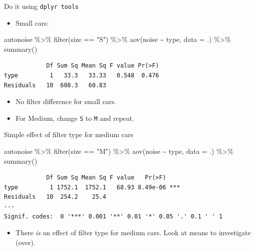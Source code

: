 \documentclass[
  ignorenonframetext,
]{beamer}
\newenvironment{Shaded}{\begin{snugshade}}{\end{snugshade}}
\newcommand{\AttributeTok}[1]{\textcolor[rgb]{0.40,0.45,0.13}{#1}}
\newcommand{\FunctionTok}[1]{\textcolor[rgb]{0.28,0.35,0.67}{#1}}
\newcommand{\NormalTok}[1]{\textcolor[rgb]{0.00,0.23,0.31}{#1}}
\newcommand{\SpecialCharTok}[1]{\textcolor[rgb]{0.37,0.37,0.37}{#1}}
\newcommand{\StringTok}[1]{\textcolor[rgb]{0.13,0.47,0.30}{#1}}
\providecommand{\tightlist}{%
  \setlength{\itemsep}{0pt}\setlength{\parskip}{0pt}}\usepackage{longtable,booktabs,array}
\begin{document}
\begin{frame}[fragile]{Do it using \texttt{dplyr\ tools}}
\protect\hypertarget{do-it-using-dplyr-tools}{}
\begin{itemize}
\tightlist
\item
  Small cars:
\end{itemize}

\begin{Shaded}
\begin{Highlighting}[]
\NormalTok{autonoise }\SpecialCharTok{\%\textgreater{}\%}
  \FunctionTok{filter}\NormalTok{(size }\SpecialCharTok{==} \StringTok{"S"}\NormalTok{) }\SpecialCharTok{\%\textgreater{}\%}
  \FunctionTok{aov}\NormalTok{(noise }\SpecialCharTok{\textasciitilde{}}\NormalTok{ type, }\AttributeTok{data =}\NormalTok{ .) }\SpecialCharTok{\%\textgreater{}\%}
  \FunctionTok{summary}\NormalTok{()}
\end{Highlighting}
\end{Shaded}

\begin{verbatim}
            Df Sum Sq Mean Sq F value Pr(>F)
type         1   33.3   33.33   0.548  0.476
Residuals   10  608.3   60.83               
\end{verbatim}

\begin{itemize}
\item
  No filter difference for small cars.
\item
  For Medium, change \texttt{S} to \texttt{M} and repeat.
\end{itemize}
\end{frame}

\begin{frame}[fragile]{Simple effect of filter type for medium cars}
\protect\hypertarget{simple-effect-of-filter-type-for-medium-cars}{}
\small

\begin{Shaded}
\begin{Highlighting}[]
\NormalTok{autonoise }\SpecialCharTok{\%\textgreater{}\%}
  \FunctionTok{filter}\NormalTok{(size }\SpecialCharTok{==} \StringTok{"M"}\NormalTok{) }\SpecialCharTok{\%\textgreater{}\%}
  \FunctionTok{aov}\NormalTok{(noise }\SpecialCharTok{\textasciitilde{}}\NormalTok{ type, }\AttributeTok{data =}\NormalTok{ .) }\SpecialCharTok{\%\textgreater{}\%}
  \FunctionTok{summary}\NormalTok{()}
\end{Highlighting}
\end{Shaded}

\begin{verbatim}
            Df Sum Sq Mean Sq F value   Pr(>F)    
type         1 1752.1  1752.1   68.93 8.49e-06 ***
Residuals   10  254.2    25.4                     
---
Signif. codes:  0 '***' 0.001 '**' 0.01 '*' 0.05 '.' 0.1 ' ' 1
\end{verbatim}

\normalsize

\begin{itemize}
\tightlist
\item
  There \emph{is} an effect of filter type for medium cars. Look at
  means to investigate (over).
\end{itemize}
\end{frame}
\end{document}
